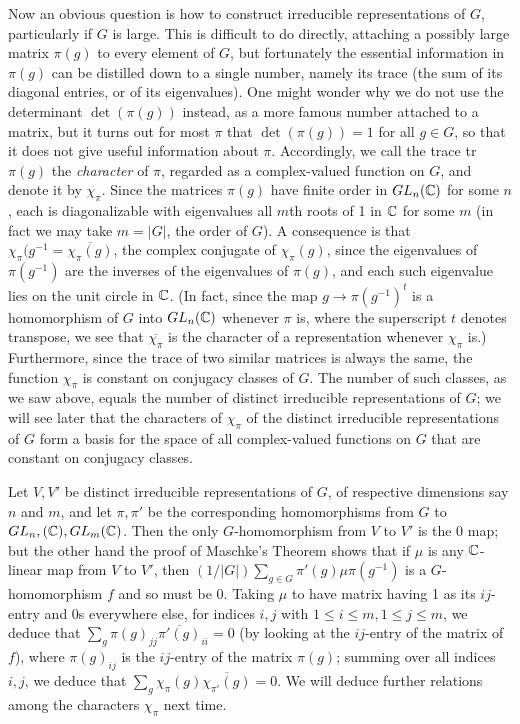\documentclass[10pt]{article}
\begin{document}
Now an obvious question is how to construct irreducible representations
of $G$, particularly if $G$ is large. This is difficult to do directly,
attaching a possibly large matrix $\pi(g)$ to every element of $G$, but
fortunately the essential information in $\pi(g)$ can be distilled down
to a single number, namely its trace (the sum of its diagonal entries,
or of its eigenvalues). One might wonder why we do not use the
determinant $\det(\pi(g))$ instead, as a more famous number attached to
a matrix, but it turns out for most $\pi$ that $\det(\pi(g)) = 1$ for
all $g\in G$, so that it does not give useful information about $\pi$.
Accordingly, we call the trace tr~$\pi(g)$ the {\sl character} of $\pi$,
regarded as a complex-valued function on $G$, and denote it by
$\chi_\pi$. Since the matrices $\pi(g)$ have finite order in $GL_n(\Bbb
C)$ for some $n$, each is diagonalizable with eigenvalues all $m$th
roots of 1 in $\Bbb C$ for some $m$ (in fact we may take $m= | G |$, the
order of $G$). A consequence is that $\chi_\pi(g^{-1} =
\overline{\chi_\pi(g)}$, the complex conjugate of $\chi_\pi(g)$, since
the eigenvalues of $\pi(g^{-1})$ are the inverses of the eigenvalues of
$\pi(g)$, and each such eigenvalue lies on the unit circle in $\Bbb C$.
(In fact, since the map $g\rightarrow\pi(g^{-1})^t$ is a homomorphism of
$G$ into $GL_n(\Bbb C)$ whenever $\pi$ is, where the superscript $t$
denotes transpose, we see that $\overline{\chi_{\pi}}$ is the character
of a representation whenever $\chi_\pi$ is.) Furthermore, since the
trace of two similar matrices is always the same, the function
$\chi_\pi$ is constant on conjugacy classes of $G$. The number of such
classes, as we saw above, equals the number of distinct irreducible
representations of $G$; we will see later that the characters of
$\chi_\pi$ of the distinct irreducible representations of $G$ form a
basis for the space of all complex-valued functions on $G$ that are
constant on conjugacy classes.

Let $V,V'$ be distinct irreducible representations of $G$, of respective
dimensions say $n$ and $m$, and let $\pi,\pi'$ be the corresponding
homomorphisms from $G$ to $GL_n,(\Bbb C), GL_m(\Bbb C)$. Then the only
$G$-homomorphism from $V$ to $V'$ is the 0 map; but the other hand the
proof of Maschke's Theorem shows that if $\mu$ is any $\Bbb C$-linear
map from $V$ to $V'$, then $(1/ | G |)\sum_{g\in G}
\pi'(g)\mu\pi(g^{-1})$ is a $G$-homomorphism $f$ and so must be 0.
Taking $\mu$ to have matrix having 1 as its $ij$-entry and 0s everywhere
else, for indices $i,j$ with $1\le i\le m,1\le j\le m$, we deduce that
$\sum_g \pi(g)_{jj} \overline{\pi'(g)}_{ii} = 0$ (by looking at the
$ij$-entry of the matrix of $f$), where $\pi(g)_{ij}$ is the $ij$-entry
of the matrix $\pi(g)$; summing over all indices $i,j$, we deduce that
$\sum_g \chi_\pi(g) \overline{\chi_{\pi'}(g)} = 0$. We will deduce
  further relations among the characters $\chi_\pi$ next time.
\end{document}
